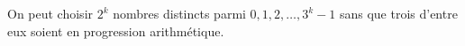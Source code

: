 On peut choisir $2^k$ nombres distincts parmi $0, 1, 2, \ldots, 3^k - 1$ sans que trois d'entre eux soient en progression arithmétique.
